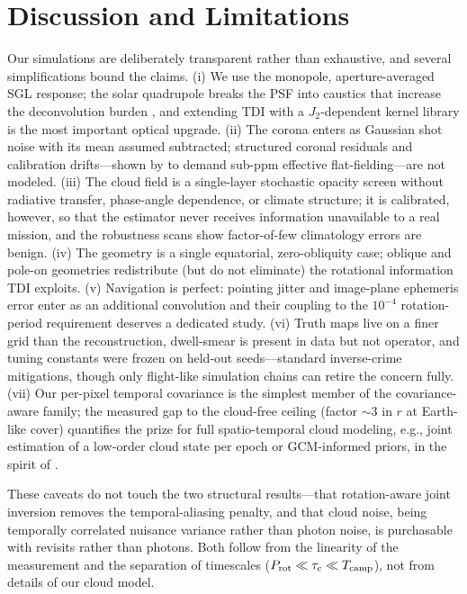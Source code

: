﻿\documentclass[twocolumn]{emulateapj}
\begin{document}
\section{Discussion and Limitations}
\label{sec:discussion}

Our simulations are deliberately transparent rather than exhaustive, and
several simplifications bound the claims. (i) We use the monopole,
aperture-averaged SGL response; the solar quadrupole breaks the PSF into
caustics that increase the deconvolution burden \citep{tt21quad}, and
extending TDI with a $J_2$-dependent kernel library is the most
important optical upgrade. (ii) The corona enters as Gaussian shot noise
with its mean assumed subtracted; structured coronal residuals and
calibration drifts---shown by \citet{tur26bench} to demand sub-ppm
effective flat-fielding---are not modeled. (iii) The cloud field is a
single-layer stochastic opacity screen without radiative transfer,
phase-angle dependence, or climate structure; it is calibrated,
however, so that the estimator never receives information unavailable
to a real mission, and the robustness scans show factor-of-few
climatology errors are benign. (iv) The geometry is a single equatorial,
zero-obliquity case; oblique and pole-on geometries redistribute (but do
not eliminate) the rotational information TDI exploits. (v) Navigation
is perfect: pointing jitter and image-plane ephemeris error enter as an
additional convolution and their coupling to the $10^{-4}$
rotation-period requirement deserves a dedicated study. (vi) Truth maps
live on a finer grid than the reconstruction, dwell-smear is present in
data but not operator, and tuning constants were frozen on held-out
seeds---standard inverse-crime mitigations, though only flight-like
simulation chains \citep{tur26bench} can retire the concern fully.
(vii) Our per-pixel temporal covariance is the simplest member of the
covariance-aware family; the measured gap to the cloud-free ceiling
(factor $\sim$3 in $r$ at Earth-like cover) quantifies the prize for
full spatio-temporal cloud modeling, e.g., joint estimation of a
low-order cloud state per epoch or GCM-informed priors, in the spirit
of \citet{cov26}.

These caveats do not touch the two structural results---that
rotation-aware joint inversion removes the temporal-aliasing penalty,
and that cloud noise, being temporally correlated nuisance variance
rather than photon noise, is purchasable with revisits rather than
photons. Both follow from the linearity of the measurement and the
separation of timescales ($P_{\rm rot}\ll\tau_c\ll T_{\rm camp}$), not
from details of our cloud model.
\end{document}
